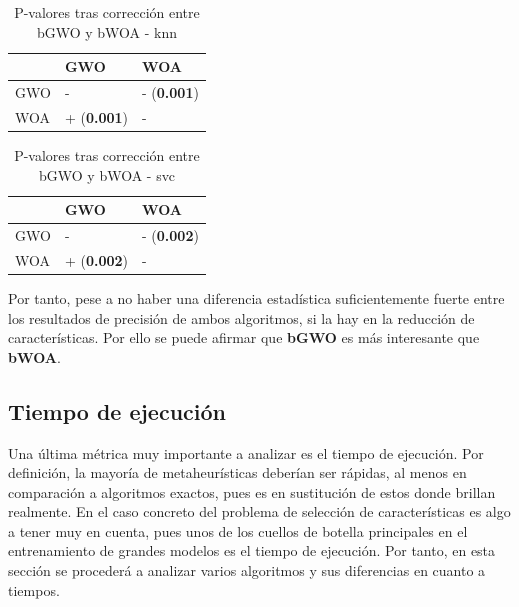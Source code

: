 \begin{table}[htp]
    \centering
    \begin{tabular}{lll}
        \toprule
        {}  & GWO                & WOA                \\
        \midrule
        GWO & -                  & - (\textbf{0.001}) \\
        WOA & + (\textbf{0.001}) & -                  \\
        \bottomrule
    \end{tabular}
    \caption{P-valores tras corrección entre bGWO y bWOA - knn}
    \label{tab:pval_corr_gwo_woa-bin_knn}
\end{table}

\begin{table}[htp]
    \centering
    \begin{tabular}{lll}
        \toprule
        {}  & GWO                & WOA                \\
        \midrule
        GWO & -                  & - (\textbf{0.002}) \\
        WOA & + (\textbf{0.002}) & -                  \\
        \bottomrule
    \end{tabular}
    \caption{P-valores tras corrección entre bGWO y bWOA - svc}
    \label{tab:pval_corr_gwo_woa-bin_svc}
\end{table}

Por tanto, pese a no haber una diferencia estadística suficientemente fuerte entre los resultados de precisión de ambos algoritmos, si la hay en la reducción de características. Por ello se puede afirmar que \textbf{bGWO} es más interesante que \textbf{bWOA}.

\clearpage
\subsection{Tiempo de ejecución}
Una última métrica muy importante a analizar es el tiempo de ejecución. Por definición, la mayoría de metaheurísticas deberían ser rápidas, al menos en comparación a algoritmos exactos, pues es en sustitución de estos donde brillan realmente. En el caso concreto del problema de selección de características es algo a tener muy en cuenta, pues unos de los cuellos de botella principales en el entrenamiento de grandes modelos es el tiempo de ejecución. Por tanto, en esta sección se procederá a analizar varios algoritmos y sus diferencias en cuanto a tiempos.\\[6pt]

